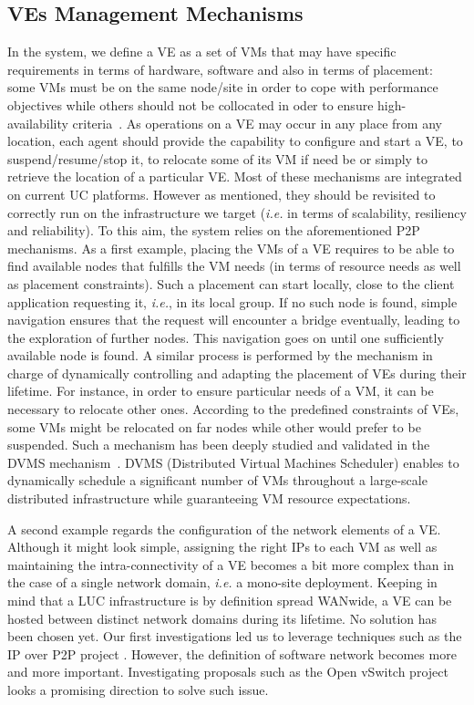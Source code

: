\subsection{VEs Management Mechanisms}
\label{ssec:vem}
In the \discovery system, we define a VE as a set of VMs that may have specific
requirements in terms of hardware, software and also in terms of placement:~
some VMs must be on the same node/site in order to cope with performance objectives while
others should not be collocated in oder to ensure
high-availability criteria~\cite{hermenier:2013}.
As operations on a VE may occur in any place from any location, each agent should provide the capability
to configure and start a VE, to suspend/resume/stop it, to relocate some of its VM if need be or simply to retrieve the location of a particular VE. 
Most of these mechanisms are integrated on current UC platforms. However as mentioned, they
should be revisited to correctly run on the infrastructure we target
(\textit{i.e.} in terms of scalability, resiliency and reliability).
To this aim, the \discovery system relies on the aforementioned P2P mechanisms. 
As a first example, placing the VMs of a VE requires to be able to find available nodes that
fulfills the VM needs (in terms of resource needs as well as placement
constraints). Such a placement can start locally, close to the client
application requesting it, \textit{i.e.}, in its local group. If no such node is
found, simple navigation ensures that the request will encounter a bridge
eventually, leading to the exploration of further nodes. This navigation goes
on until one sufficiently available node is found.
A similar process is performed by the mechanism in charge of  dynamically
controlling and adapting the placement of VEs during their lifetime.  For instance, in
order to ensure particular needs of a VM, it can be necessary to relocate other
ones. According to the predefined constraints of VEs, some VMs might be
relocated on far nodes while other would prefer to be suspended.  Such a
mechanism has been deeply studied and validated in the DVMS
mechanism~\cite{dvms:wiki,quesnel:2012}. DVMS (Distributed Virtual
Machines Scheduler) enables to dynamically schedule a significant number of VMs
throughout a large-scale distributed infrastructure while guaranteeing VM
resource expectations.  

A second example regards the configuration of the network elements of a VE. 
Although it might look simple, assigning the right IPs to
each VM as well as maintaining the intra-connectivity of a VE becomes a bit more complex than in
the case of a single network domain, \textit{i.e.} a mono-site deployment.
%
Keeping in mind that a LUC infrastructure is
by definition spread WANwide, a VE can be hosted between distinct network
domains during its lifetime. No solution has been chosen yet. 
Our first investigations led us to leverage techniques
such as the IP over P2P project \cite{ganguly:2006}. However, the definition of
software network becomes more and more important. Investigating proposals such as
the Open vSwitch project \cite{pfaff:2009} looks a promising direction to solve such issue.
%

